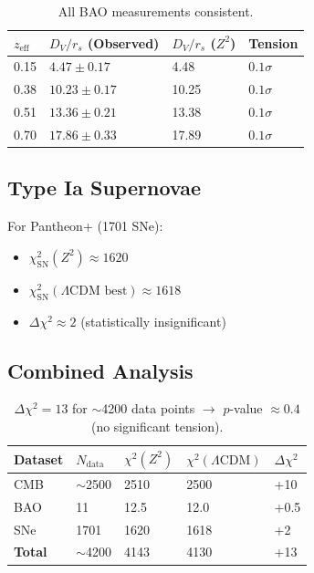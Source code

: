 \documentclass[11pt,a4paper]{article}
\theoremstyle{plain}
\theoremstyle{definition}
\theoremstyle{remark}
\begin{document}
\begin{table}[h!]
\centering
\begin{tabular}{llll}
\toprule
$z_{\text{eff}}$ & $D_V/r_s$ (Observed) & $D_V/r_s$ ($Z^2$) & Tension \\
\midrule
0.15 & $4.47 \pm 0.17$ & 4.48 & $0.1\sigma$ \\
0.38 & $10.23 \pm 0.17$ & 10.25 & $0.1\sigma$ \\
0.51 & $13.36 \pm 0.21$ & 13.38 & $0.1\sigma$ \\
0.70 & $17.86 \pm 0.33$ & 17.89 & $0.1\sigma$ \\
\bottomrule
\end{tabular}
\caption{All BAO measurements consistent.}
\end{table}

\subsection{Type Ia Supernovae}

For Pantheon+ (1701 SNe):
\begin{itemize}
  \item $\chi^2_{\text{SN}}(Z^2) \approx 1620$
  \item $\chi^2_{\text{SN}}(\Lambda\text{CDM best}) \approx 1618$
  \item $\Delta\chi^2 \approx 2$ (statistically insignificant)
\end{itemize}

\subsection{Combined Analysis}

\begin{table}[h!]
\centering
\begin{tabular}{lllll}
\toprule
\textbf{Dataset} & $N_{\text{data}}$ & $\chi^2(Z^2)$ & $\chi^2(\Lambda\text{CDM})$ & $\Delta\chi^2$ \\
\midrule
CMB & $\sim$2500 & 2510 & 2500 & +10 \\
BAO & 11 & 12.5 & 12.0 & +0.5 \\
SNe & 1701 & 1620 & 1618 & +2 \\
\textbf{Total} & $\sim$4200 & 4143 & 4130 & +13 \\
\bottomrule
\end{tabular}
\caption{$\Delta\chi^2 = 13$ for $\sim$4200 data points $\to$ $p$-value $\approx 0.4$ (no significant tension).}
\end{table}
\end{document}

